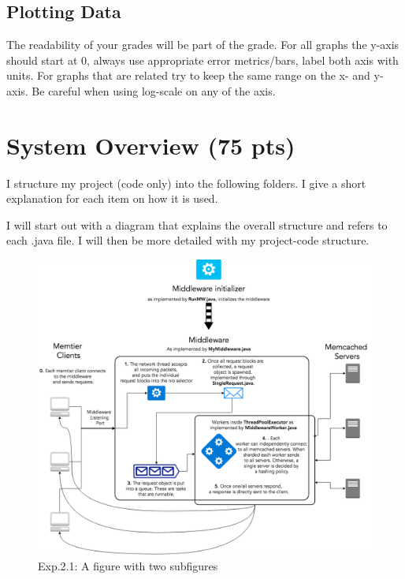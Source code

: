 \documentclass[11pt,a4paper]{article}
\begin{document}
\subsection*{Plotting Data}
The readability of your grades will be part of the grade. For all graphs the y-axis should start at 0, always use appropriate error metrics/bars, label both axis with units. For graphs that are related try to keep the same range on the x- and y-axis. Be careful when using log-scale on any of the axis. 
\newpage

\section{System Overview (75 pts)}

I structure my project (code only) into the following folders.
I give a short explanation for each item on how it is used.

I will start out with a diagram that explains the overall structure and refers to each .java file.
I will then be more detailed with my project-code structure.

\begin{figure}[H]
\centering
\includegraphics[width=\textwidth]{img/middleware_diagram.png}
\caption{Exp.2.1: A figure with two subfigures}
\label{fig:test}
\end{figure}
\end{document}
